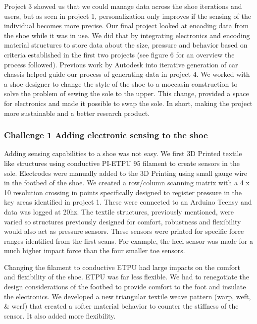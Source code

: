 Project 3 showed us that we could manage data across the shoe iterations and users, but as seen in project 1, personalization only improves if the sensing of the individual becomes more precise. Our final project looked at encoding data from the shoe while it was in use. We did that by integrating electronics and encoding material structures to store data about the size, pressure and behavior based on criteria established in the first two projects (see figure 6 for an overview the process followed). Previous work by Autodesk into iterative generation of car chassis \cite{Nourbakhsh2016} helped guide our process of generating data in project 4. We worked with a shoe designer to change the style of the shoe to a moccasin construction to solve the problem of sewing the sole to the upper. This change, provided a space for electronics and made it possible to swap the sole. In short, making the project more sustainable and a better research product.

\subsubsection{Challenge 1 Adding electronic sensing to the shoe}

Adding sensing capabilities to a shoe was not easy. We first 3D Printed textile like structures using conductive PI-ETPU 95 filament to create sensors in the sole. Electrodes were manually added to the 3D Printing using small gauge wire in the footbed of the shoe. We created a row/column scanning matrix with a 4 x 10 resolution crossing in points specifically designed to register pressure in the key areas identified in project 1. These were connected to an Arduino Teensy and data was logged at 20hz. The textile structures, previously mentioned, were varied so structures previously designed for comfort, robustness and flexibility would also act as pressure sensors. These sensors were printed for specific force ranges identified from the first scans. For example, the heel sensor was made for a much higher impact force than the four smaller toe sensors.

Changing the filament to conductive ETPU had large impacts on the comfort and flexibility of the shoe. ETPU was far less flexible. We had to renegotiate the design considerations of the footbed to provide comfort to the foot and insulate the electronics. We developed a new triangular textile weave pattern (warp, weft, \& werf) that created a softer material behavior to counter the stiffness of the sensor. It also added more flexibility. 

